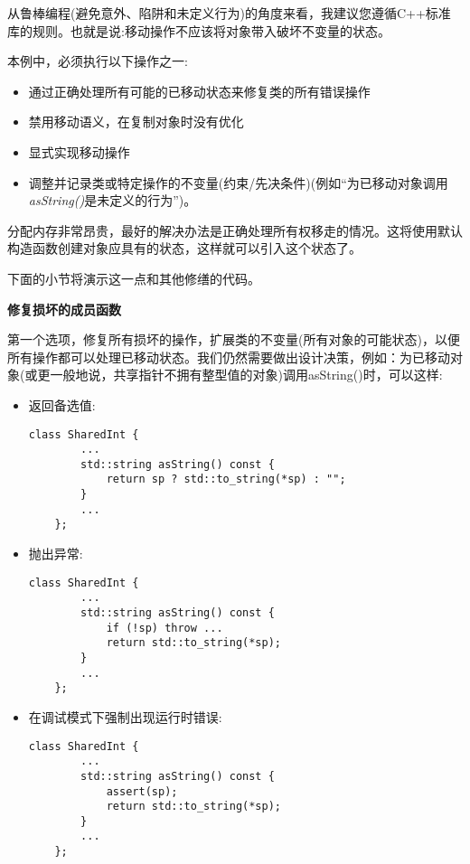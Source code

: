 从鲁棒编程(避免意外、陷阱和未定义行为)的角度来看，我建议您遵循C++标准库的规则。也就是说:移动操作不应该将对象带入破坏不变量的状态。\par

本例中，必须执行以下操作之一:\par

\begin{itemize}
	\item 通过正确处理所有可能的已移动状态来修复类的所有错误操作
	\item 禁用移动语义，在复制对象时没有优化
	\item 显式实现移动操作
	\item 调整并记录类或特定操作的不变量(约束/先决条件)(例如“为已移动对象调用\textit{asString()}是未定义的行为”)。
\end{itemize}

分配内存非常昂贵，最好的解决办法是正确处理所有权移走的情况。这将使用默认构造函数创建对象应具有的状态，这样就可以引入这个状态了。\par

下面的小节将演示这一点和其他修缮的代码。\par

\hspace*{\fill} \par %
\textbf{修复损坏的成员函数}

第一个选项，修复所有损坏的操作，扩展类的不变量(所有对象的可能状态)，以便所有操作都可以处理已移动状态。我们仍然需要做出设计决策，例如：为已移动对象(或更一般地说，共享指针不拥有整型值的对象)调用asString()时，可以这样:\par

\begin{itemize}
	\item 返回备选值:\par
	\begin{lstlisting}[caption={}]
	class SharedInt {
		...
		std::string asString() const {
			return sp ? std::to_string(*sp) : "";
		}
		...
	};
	\end{lstlisting}
	\item 抛出异常:\par
	\begin{lstlisting}[caption={}]
	class SharedInt {
		...
		std::string asString() const {
			if (!sp) throw ...
			return std::to_string(*sp);
		}
		...
	};
	\end{lstlisting}
	\item 在调试模式下强制出现运行时错误:\par
	\begin{lstlisting}[caption={}]
	class SharedInt {
		...
		std::string asString() const {
			assert(sp);
			return std::to_string(*sp);
		}
		...
	};
	\end{lstlisting}
\end{itemize}


